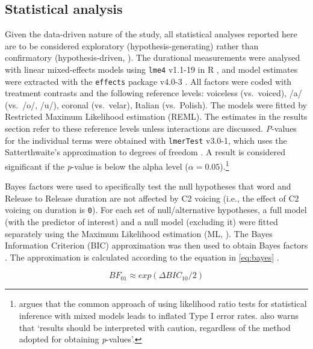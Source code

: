 \documentclass[12pt,]{article}
\let\rmarkdownfootnote\footnote%
\def\footnote{\protect\rmarkdownfootnote}
\begin{document}
\hypertarget{statistical-analysis}{%
\subsection{Statistical analysis}\label{statistical-analysis}}

Given the data-driven nature of the study, all statistical analyses
reported here are to be considered exploratory (hypothesis-generating)
rather than confirmatory (hypothesis-driven,
\citealt{kerr1998, gelman2013, roettger2018}). The durational
measurements were analysed with linear mixed-effects models using
\texttt{lme4} v1.1-19 in R \citep{bates2015}, and model estimates were
extracted with the \texttt{effects} package v4.0-3 \citep{fox2003}. All
factors were coded with treatment contrasts and the following reference
levels: voiceless (vs.~voiced), /a/ (vs.~/o/, /u/), coronal (vs.~velar),
Italian (vs.~Polish). The models were fitted by Restricted Maximum
Likelihood estimation (REML). The estimates in the results section refer
to these reference levels unless interactions are discussed.
\emph{P}-values for the individual terms were obtained with
\texttt{lmerTest} v3.0-1, which uses the Satterthwaite's approximation
to degrees of freedom \citep{kuznetsova2017, luke2017}. A result is
considered significant if the \emph{p}-value is below the alpha level
(\(\alpha = 0.05\)).\footnote{\citet{luke2017} argues that the common approach of using likelihood ratio tests for statistical inference with mixed models leads to inflated Type I error rates. \citet[1501]{luke2017} also warns that `results should be interpreted with caution, regardless of the method adopted for obtaining \textit{p}-values'.}

Bayes factors were used to specifically test the null hypotheses that
word and Release to Release duration are not affected by C2 voicing
(i.e., the effect of C2 voicing on duration is \texttt{0}). For each set
of null/alternative hypotheses, a full model (with the predictor of
interest) and a null model (excluding it) were fitted separately using
the Maximum Likelihood estimation (ML, \citealt[34]{bates2015}). The
Bayes Information Criterion (BIC) approximation was then used to obtain
Bayes factors
\citep{raftery1995, raftery1999, wagenmakers2007, jarosz2014}. The
approximation is calculated according to the equation in \ref{eq:bayes}
\citet[796]{wagenmakers2007}.

\begin{equation}
\label{eq:bayes}
BF_{01} \approx exp(\Delta{}BIC_{10}/2)
\end{equation}
\end{document}
